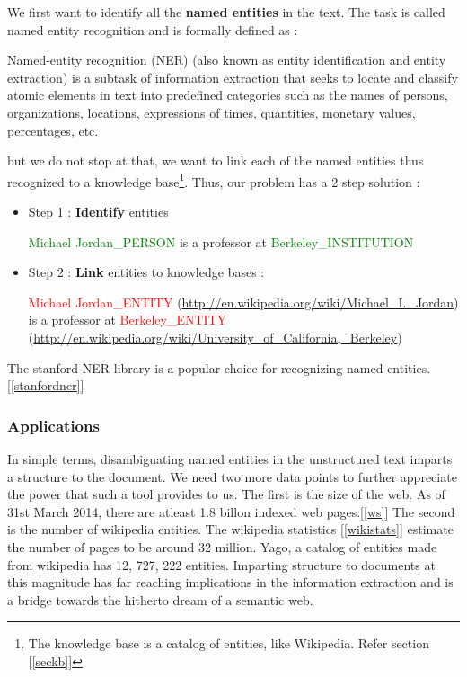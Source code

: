  We first want to identify all the \textbf{named entities} in the text. The task is called named entity recognition and is 
 formally defined as : 
 \begin{mydef}
 \label{nerdef}
   Named-entity recognition (NER) (also known as entity identification and entity extraction) is a subtask of information extraction that seeks to locate and classify 
   atomic elements in text into predefined categories such as the names of persons, organizations, locations, expressions of times, quantities, monetary values, percentages, etc.
  \end{mydef}
 but we do not stop at that, we want to link each of the named entities thus recognized to a knowledge base\footnote{The knowledge base is a catalog of entities, like Wikipedia. Refer section [\ref{seckb}]}.
 Thus, our problem has a 2 step solution : 

 
 \begin{itemize}  
  \item Step 1 : \textbf{Identify} entities
  \medskip
  
  \textcolor{green}{Michael Jordan\_PERSON} is a professor at \textcolor{green}{Berkeley\_INSTITUTION} \medskip
  \item Step 2 : \textbf{Link} entities to knowledge bases : 
  \medskip
  
  \textcolor{red}{Michael Jordan\_ENTITY} (\url{http://en.wikipedia.org/wiki/Michael_I._Jordan})  is a professor at  
  \textcolor{red}{Berkeley\_ENTITY} (\url{http://en.wikipedia.org/wiki/University_of_California,_Berkeley})
\end{itemize}

The stanford NER library is a popular choice for recognizing named entities. [\ref{stanfordner}]
\subsubsection{Applications}


In simple terms, disambiguating named entities in the unstructured text imparts a structure to the document. 
We need two more data points to further appreciate the power that such a tool provides to us.
The first is the size of the web. As of 31st March 2014, there are atleast 1.8 billon indexed web pages.[\ref{ws}]
The second is the number of wikipedia entities. The wikipedia statistics [\ref{wikistats}] estimate the number of pages to be
around 32 million. Yago, a catalog of entities made from wikipedia has 12, 727, 222 entities.	
Imparting structure to documents at this magnitude has far reaching implications in the information
extraction and is a bridge towards the hitherto dream of a semantic web.  \\


